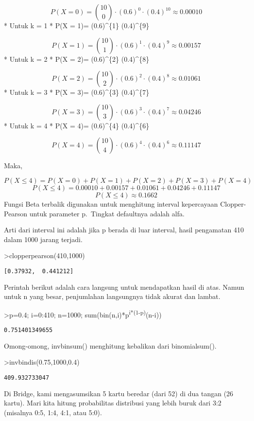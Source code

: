 \documentclass[
]{book}
\begin{document}
\[P(X=0)= \binom{10}{0} \cdot (0.6)^{0} \cdot (0.4)^{10} \approx 0.00010\]* Untuk k = 1 * P(X = 1)=  \cdot (0.6)\^{}\{1\} \cdot (0.4)\^{}\{9\} 

\[P(X = 1)= \binom{10}{1} \cdot (0.6)^{1} \cdot (0.4)^{9} \approx 0.00157\]* Untuk k = 2 * P(X = 2)=  \cdot (0.6)\^{}\{2\} \cdot (0.4)\^{}\{8\} 

\[P(X = 2)= \binom{10}{2} \cdot (0.6)^{2} \cdot (0.4)^{8} \approx 0.01061\]* Untuk k = 3 * P(X = 3)=  \cdot (0.6)\^{}\{3\} \cdot (0.4)\^{}\{7\} 

\[P(X = 3)= \binom{10}{3} \cdot (0.6)^{3} \cdot (0.4)^{7} \approx 0.04246\]* Untuk k = 4 * P(X = 4)=  \cdot (0.6)\^{}\{4\} \cdot (0.4)\^{}\{6\} 

\[P(X = 4)= \binom{10}{4} \cdot (0.6)^{4} \cdot (0.4)^{6} \approx 0.11147\]

Maka,

\[P(X \leq 4)= P(X=0)+P(X=1)+P(X=2)+P(X=3)+P(X=4)\]\[P(X \leq 4)= 0.00010 + 0.00157 + 0.01061+ 0.04246+ 0.11147\]\[P(X \leq 4)\approx 0.1662\]Fungsi Beta terbalik digunakan untuk menghitung interval kepercayaan Clopper-Pearson untuk parameter p.~Tingkat defaultnya adalah alfa.

Arti dari interval ini adalah jika p berada di luar interval, hasil pengamatan 410 dalam 1000 jarang terjadi.

\textgreater clopperpearson(410,1000)

\begin{verbatim}
[0.37932,  0.441212]
\end{verbatim}

Perintah berikut adalah cara langsung untuk mendapatkan hasil di atas. Namun untuk n yang besar, penjumlahan langsungnya tidak akurat dan lambat.

\textgreater p=0.4; i=0:410; n=1000; sum(bin(n,i)*p\textsuperscript{i*(1-p)}(n-i))

\begin{verbatim}
0.751401349655
\end{verbatim}

Omong-omong, invbinsum() menghitung kebalikan dari binomialsum().

\textgreater invbindis(0.75,1000,0.4)

\begin{verbatim}
409.932733047
\end{verbatim}

Di Bridge, kami mengasumsikan 5 kartu beredar (dari 52) di dua tangan (26 kartu). Mari kita hitung probabilitas distribusi yang lebih buruk dari 3:2 (misalnya 0:5, 1:4, 4:1, atau 5:0).
\end{document}
